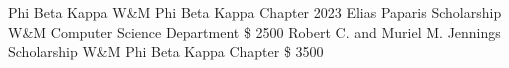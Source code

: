
\begin{cvhonors}
\cvhonor
{Phi Beta Kappa}
{W\&M Phi Beta Kappa Chapter}
{}
{2023}
\cvhonor
{Elias Paparis Scholarship}
{W\&M Computer Science Department}
{\$ 2500}
{}
\cvhonor
{Robert C. and Muriel M. Jennings Scholarship}
{W\&M Phi Beta Kappa Chapter}
{\$ 3500}
{}

\end{cvhonors}
